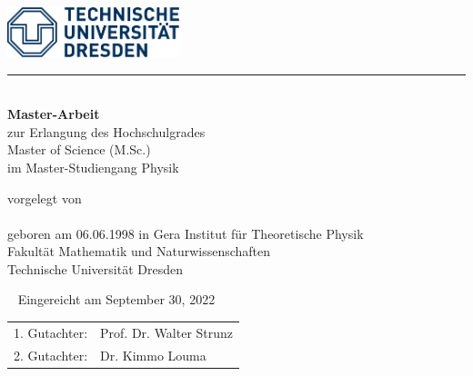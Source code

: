 \makeatletter
\thispagestyle{empty}
\begin{titlepage}
  \includegraphics[width=5cm]{figs/logo.pdf}
  \vspace{1em}
  \hrule

  {\centering
  \vspace*{5em}
  {\bfseries\Huge \@title\\}
  \vspace*{2em}
  {\Large\@subtitle}
    \vfill \vfill
    {\large {\bfseries Master-Arbeit} \\
      zur Erlangung des Hochschulgrades\\
      Master of Science (M.Sc.)\\
      im Master-Studiengang Physik}

    \vfill
      {vorgelegt von\\
      {\large \@author}\\
      geboren am 06.06.1998 in Gera}
  \vfill
  {\large Institut f\"ur Theoretische Physik\\
    Fakultät Mathematik und Naturwissenschaften\\
    Technische Universität Dresden \\}
}

\newpage \thispagestyle{empty}\ \newpage
\clearpage
\thispagestyle{empty}
\null\vfill
{\large Eingereicht am September 30, 2022}

\begin{tabular*}{.5\linewidth}[h]{ll}
  1. Gutachter: & Prof. Dr. Walter Strunz \\
  2. Gutachter: & Dr. Kimmo Louma \\
\end{tabular*}
\end{titlepage}
\makeatother
